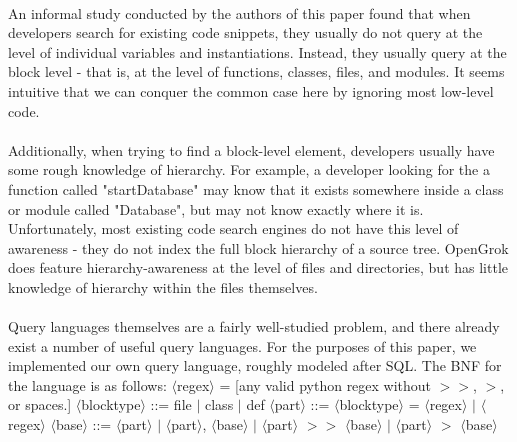 \documentclass{article}
\begin{document}
\paragraph{}
An informal study conducted by the authors of this paper found that when developers search for existing code snippets, they usually do not query at the level of individual variables and instantiations. Instead, they usually query at the block level - that is, at the level of functions, classes, files, and modules. It seems intuitive that we can conquer the common case here by ignoring most low-level code.

\paragraph{}
Additionally, when trying to find a block-level element, developers usually have some rough knowledge of hierarchy. For example, a developer looking for the a function called "startDatabase" may know that it exists somewhere inside a class or module called "Database", but may not know exactly where it is. Unfortunately, most existing code search engines do not have this level of awareness - they do not index the full block hierarchy of a source tree. OpenGrok does feature hierarchy-awareness at the level of files and directories, but has little knowledge of hierarchy within the files themselves.

\paragraph{}
Query languages themselves are a fairly well-studied problem, and there already exist a number of useful query languages. For the purposes of this paper, we implemented our own query language, roughly modeled after SQL. The BNF for the language is as follows:\newline
\newline
$\langle$regex$\rangle$ = [any valid python regex without $>>$, $>$, or spaces.]
\newline
$\langle$blocktype$\rangle$ ::= file $|$ class $|$ def
\newline
$\langle$part$\rangle$ ::= $\langle$blocktype$\rangle$ = $\langle$regex$\rangle$ $|$ $\langle$regex$\rangle$
\newline
$\langle$base$\rangle$ ::= $\langle$part$\rangle$ $|$ $\langle$part$\rangle$, $\langle$base$\rangle$ $|$ $\langle$part$\rangle$ $>>$ $\langle$base$\rangle$ $|$ $\langle$part$\rangle$ $>$ $\langle$base$\rangle$
\newline
\end{document}
